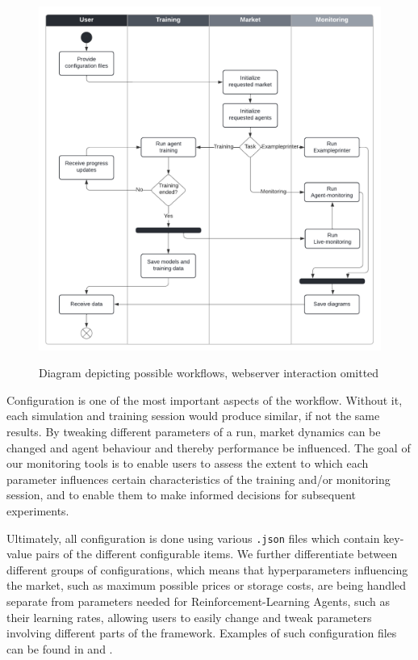 \begin{figure}[t]
	\centering
	\includegraphics[width = \textwidth]{images/workflow_swimlanes.pdf}\\
	\caption{Diagram depicting possible workflows, webserver interaction omitted}\label{fig:WorkflowSwimlanes}
\end{figure}

Configuration is one of the most important aspects of the workflow. Without it, each simulation and training session would produce similar, if not the same results. By tweaking different parameters of a run, market dynamics can be changed and agent behaviour and thereby performance be influenced. The goal of our monitoring tools is to enable users to assess the extent to which each parameter influences certain characteristics of the training and/or monitoring session, and to enable them to make informed decisions for subsequent experiments.

Ultimately, all configuration is done using various \texttt{.json} files which contain key-value pairs of the different configurable items. We further differentiate between different groups of configurations, which means that hyperparameters influencing the market, such as maximum possible prices or storage costs, are being handled separate from parameters needed for Reinforcement-Learning Agents, such as their learning rates, allowing users to easily change and tweak parameters involving different parts of the framework. Examples of such configuration files can be found in  and .

